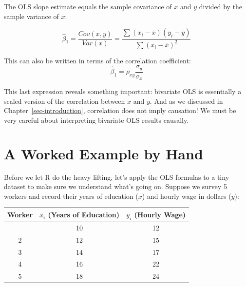 \documentclass[
  letterpaper,
  DIV=11,
  numbers=noendperiod]{scrreprt}
\newcounter{none} %
\begin{document}
\begin{tcolorbox}[enhanced jigsaw, arc=.35mm, bottomrule=.15mm, bottomtitle=1mm, breakable, colback=white, colbacktitle=quarto-callout-important-color!10!white, colframe=quarto-callout-important-color-frame, coltitle=black, left=2mm, leftrule=.75mm, opacityback=0, opacitybacktitle=0.6, rightrule=.15mm, title=\textcolor{quarto-callout-important-color}{\faExclamation}\hspace{0.5em}{The OLS Slope Formula}, titlerule=0mm, toprule=.15mm, toptitle=1mm]

The OLS slope estimate equals the sample covariance of \(x\) and \(y\)
divided by the sample variance of \(x\):

\[
\hat{\beta}_1 = \frac{Cov(x, y)}{Var(x)} = \frac{\sum(x_i - \bar{x})(y_i - \bar{y})}{\sum(x_i - \bar{x})^2}
\]

This can also be written in terms of the correlation coefficient: \[
\hat{\beta}_1 = \rho_{xy} \frac{\sigma_y}{\sigma_x}
\]

\end{tcolorbox}

This last expression reveals something important: bivariate OLS is
essentially a scaled version of the correlation between \(x\) and \(y\).
And as we discussed in Chapter~\ref{sec-introduction}, correlation does
not imply causation! We must be very careful about interpreting
bivariate OLS results causally.

\section{A Worked Example by Hand}\label{a-worked-example-by-hand}

Before we let R do the heavy lifting, let's apply the OLS formulas to a
tiny dataset to make sure we understand what's going on. Suppose we
survey 5 workers and record their years of education (\(x\)) and hourly
wage in dollars (\(y\)):

{\def\LTcaptype{none} %
\begin{longtable}[]{@{}ccc@{}}
\toprule\noalign{}
Worker & \(x_i\) (Years of Education) & \(y_i\) (Hourly Wage) \\
\midrule\noalign{}
\endhead
\bottomrule\noalign{}
\endlastfoot
1 & 10 & 12 \\
2 & 12 & 15 \\
3 & 14 & 17 \\
4 & 16 & 22 \\
5 & 18 & 24 \\
\end{longtable}
}
\end{document}
